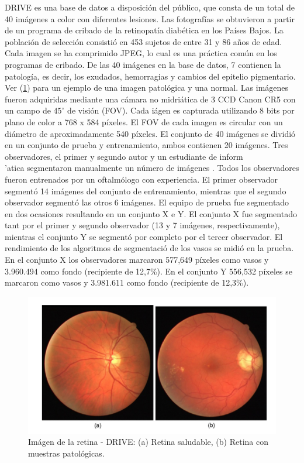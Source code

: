 DRIVE es una base de datos a disposici\'on del p\'ublico, que consta de un total de 40 im\'agenes a color con diferentes lesiones. Las fotograf\'ias se obtuvieron a partir de un programa de cribado de la retinopat\'ia diab\'etica en los Pa\'ises Bajos. La poblaci\'on de selecci\'on consisti\'o en 453 sujetos de entre 31 y 86 a\~nos de edad. Cada imagen se ha comprimido JPEG, lo cual es una pr\'actica com\'un en los programas de cribado. De las 40 im\'agenes en la base de datos, 7 contienen la patolog\'ia, es decir, los exudados, hemorragias y cambios del epitelio pigmentario. Ver (\ref{fig:Drive_images_retinal}) para un ejemplo de una imagen patológica y una normal. Las im\'agenes fueron adquiridas mediante una c\'amara no midriática de 3 CCD Canon CR5 con un campo de $45^{\circ}$ de visi\'on (FOV). Cada i\'agen es capturada utilizando 8 bits por plano de color a 768 {x} 584 p\'ixeles. El FOV de cada imagen es circular con un di\'ametro de aproximadamente 540 p\'ixeles. El conjunto de 40 im\'agenes se dividi\'o en un conjunto de prueba y entrenamiento, ambos contienen 20 im\'agenes. Tres observadores, el primer y segundo autor y un estudiante de inform\\'atica segmentaron manualmente un n\'umero de im\'agenes \cite{orlando2016discriminatively}. Todos los observadores fueron entrenados por un oftalm\'ologo con experiencia. El primer observador segment\'o 14 im\'agenes del conjunto de entrenamiento, mientras que el segundo observador segment\'o las otros 6 im\'agenes. El equipo de prueba fue segmentado en dos ocasiones resultando en un conjunto X e Y. El conjunto X fue segmentado tant por el primer y segundo observador (13 y 7 im\'agenes, respectivamente), mientras el conjunto Y se segmentó por completo por el tercer observador. El rendimiento de los algoritmos de segmentaci\'o de los vasos se midi\'o en la prueba. En el conjunto X los observadores marcaron 577,649 p\'ixeles como vasos y 3.960.494 como fondo (recipiente de 12,7\%). En el conjunto Y 556,532 p\'ixeles se marcaron como vasos y 3.981.611 como fondo (recipiente de 12,3\%).\\ \cite{fraz2012blood}


\begin{figure}[H]
	{
	\centering
	\includegraphics[width=1\textwidth]{Figures/Drive_images_retinal}
	\caption[Drive]{Im\'agen de la retina - DRIVE: (a) Retina saludable, (b) Retina con muestras patol\'ogicas.}
	\label{fig:Drive_images_retinal}
	}
\end{figure}	


